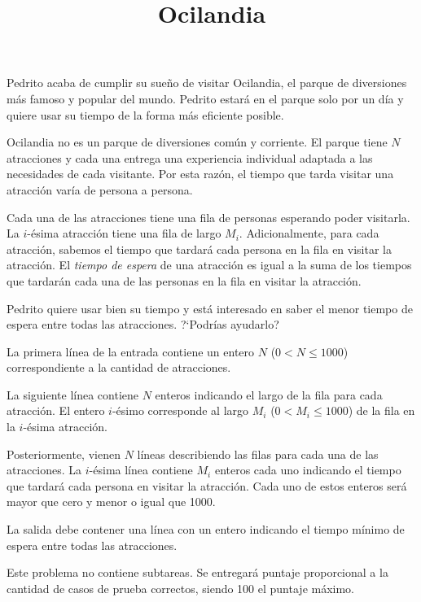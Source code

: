 \documentclass{oci}
\title{Ocilandia}
\begin{document}
\begin{problemDescription}
  Pedrito acaba de cumplir su sueño de visitar Ocilandia, el parque de diversiones más famoso y
  popular del mundo.
  Pedrito estará en el parque solo por un día y quiere usar su tiempo de la forma más eficiente posible.

  Ocilandia no es un parque de diversiones común y corriente.
  El parque tiene $N$ atracciones y cada una entrega una experiencia individual adaptada a
  las necesidades de cada visitante.
  Por esta razón, el tiempo que tarda visitar una atracción varía de persona a persona.

  Cada una de las atracciones tiene una fila de personas esperando poder visitarla.
  La $i$-ésima atracción tiene una fila de largo $M_i$.
  Adicionalmente, para cada atracción, sabemos el tiempo que tardará cada persona en la fila en
  visitar la atracción.
  El \emph{tiempo de espera} de una atracción es igual a la suma de los tiempos que tardarán
  cada una de las personas en la fila en visitar la atracción.

  Pedrito quiere usar bien su tiempo y está interesado en saber el menor tiempo de espera entre
  todas las atracciones.
  ?`Podrías ayudarlo?
\end{problemDescription}

\begin{inputDescription}
  La primera línea de la entrada contiene un entero $N$ ($0 < N \leq 1000$) correspondiente a la
  cantidad de atracciones.

  La siguiente línea contiene $N$ enteros indicando el largo de la fila para cada atracción.
  El entero $i$-ésimo corresponde al largo $M_i$ ($0 < M_i \leq 1000$) de la fila en la $i$-ésima atracción.

  Posteriormente, vienen $N$ líneas describiendo las filas para cada una de las atracciones.
  La $i$-ésima línea contiene $M_i$ enteros cada uno indicando el tiempo que tardará cada persona
  en visitar la atracción.
  Cada uno de estos enteros será mayor que cero y menor o igual que 1000.
\end{inputDescription}

\begin{outputDescription}
  La salida debe contener una línea con un entero indicando el tiempo mínimo de espera entre todas
  las atracciones.
\end{outputDescription}

\begin{scoreDescription}
  Este problema no contiene subtareas.
  Se entregará puntaje proporcional a la cantidad de casos de prueba correctos,
  siendo 100 el puntaje máximo.
\end{scoreDescription}

\begin{sampleDescription}
\end{sampleDescription}
\end{document}
